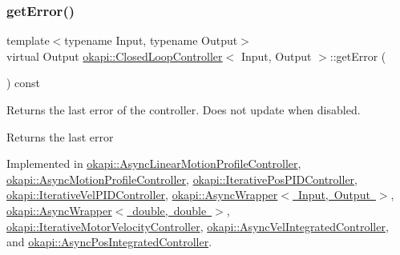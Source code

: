 \mbox{\label{classokapi_1_1ClosedLoopController_a50c73444ff6e3e631951c43d0f951953}} 
\subsubsection{\texorpdfstring{getError()}{getError()}}
{\footnotesize\ttfamily template$<$typename Input, typename Output$>$ \\
virtual Output \mbox{\hyperlink{classokapi_1_1ClosedLoopController}{okapi\+::\+Closed\+Loop\+Controller}}$<$ Input, Output $>$\+::get\+Error (\begin{DoxyParamCaption}{ }\end{DoxyParamCaption}) const\hspace{0.3cm}{\ttfamily [pure virtual]}}

Returns the last error of the controller. Does not update when disabled.

\begin{DoxyReturn}{Returns}
the last error 
\end{DoxyReturn}


Implemented in \mbox{\hyperlink{classokapi_1_1AsyncLinearMotionProfileController_a31057c2bb8cface61147b1edd0d97ce5}{okapi\+::\+Async\+Linear\+Motion\+Profile\+Controller}}, \mbox{\hyperlink{classokapi_1_1AsyncMotionProfileController_aae5c2ef0766fba9e635c43c0314da10a}{okapi\+::\+Async\+Motion\+Profile\+Controller}}, \mbox{\hyperlink{classokapi_1_1IterativePosPIDController_a632611340113011f75c7ee1c389231e3}{okapi\+::\+Iterative\+Pos\+P\+I\+D\+Controller}}, \mbox{\hyperlink{classokapi_1_1IterativeVelPIDController_a7e60b432a91d73db0a62c5d31759ed10}{okapi\+::\+Iterative\+Vel\+P\+I\+D\+Controller}}, \mbox{\hyperlink{classokapi_1_1AsyncWrapper_a64b690883ff7475375a6d08ad3fb62f9}{okapi\+::\+Async\+Wrapper$<$ Input, Output $>$}}, \mbox{\hyperlink{classokapi_1_1AsyncWrapper_a64b690883ff7475375a6d08ad3fb62f9}{okapi\+::\+Async\+Wrapper$<$ double, double $>$}}, \mbox{\hyperlink{classokapi_1_1IterativeMotorVelocityController_aee5e0bfdaa45c2748b9f4bf8b549f286}{okapi\+::\+Iterative\+Motor\+Velocity\+Controller}}, \mbox{\hyperlink{classokapi_1_1AsyncVelIntegratedController_a6641352cebd3f0baa4e3e1ab4ad27be3}{okapi\+::\+Async\+Vel\+Integrated\+Controller}}, and \mbox{\hyperlink{classokapi_1_1AsyncPosIntegratedController_a82aeb0cb2d1aab524b9a79a249260e11}{okapi\+::\+Async\+Pos\+Integrated\+Controller}}.

